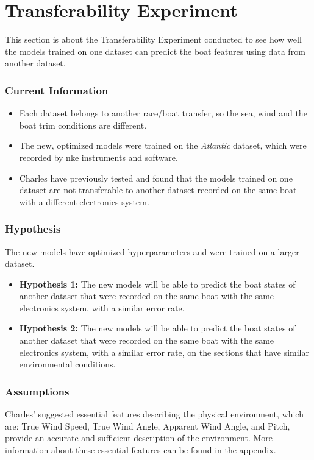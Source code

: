 \documentclass[12pt,twoside]{report}
\begin{document}
\vspace{5em}
\section{Transferability Experiment} \label{section:transferability}

This section is about the Transferability Experiment conducted to see how well the models trained on one dataset can predict the boat features using data from another dataset.

\subsubsection{Current Information}
\begin{itemize}
  \item Each dataset belongs to another race/boat transfer, so the sea, wind and the boat trim conditions are different.
  \item The new, optimized models were trained on the \textit{Atlantic} dataset, which were recorded by nke instruments and software.
  \item Charles have previously tested and found that the models trained on one dataset are not transferable to another dataset recorded on the same boat with a different electronics system.
\end{itemize}

\subsubsection{Hypothesis}
The new models have optimized hyperparameters and were trained on a larger dataset.
\begin{itemize}
  \item \textbf{Hypothesis 1:} The new models will be able to predict the boat states of another dataset that were recorded on the same boat with the same electronics system, with a similar error rate.
  \item \textbf{Hypothesis 2:} The new models will be able to predict the boat states of another dataset that were recorded on the same boat with the same electronics system, with a similar error rate, on the sections that have similar environmental conditions.
\end{itemize}

\subsubsection{Assumptions}
Charles' suggested essential features describing the physical environment, which are: True Wind Speed, True Wind Angle, Apparent Wind Angle, and Pitch, provide an accurate and sufficient description of the environment. More information about these essential features can be found in the appendix.
\end{document}
